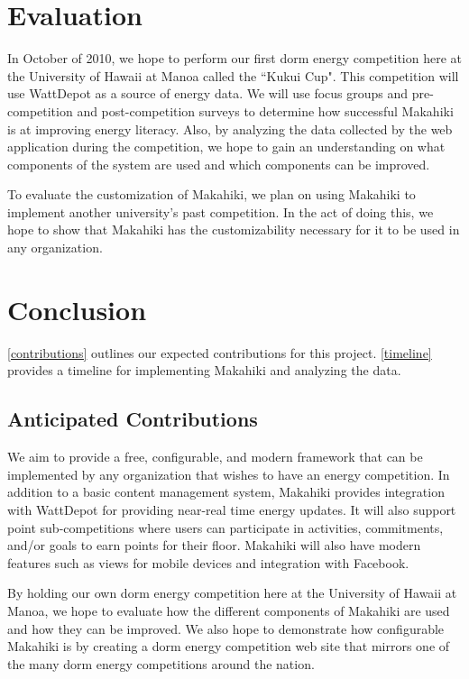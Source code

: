 \chapter{Evaluation}
\label{evaluation}

In October of 2010, we hope to perform our first dorm energy competition here at the University of Hawaii at Manoa called the ``Kukui Cup".  This competition will use WattDepot as a source of energy data.  We will use focus groups and pre-competition and post-competition surveys to determine how successful Makahiki is at improving energy literacy.  Also, by analyzing the data collected by the web application during the competition, we hope to gain an understanding on what components of the system are used and which components can be improved.

To evaluate the customization of Makahiki, we plan on using Makahiki to implement another university's past competition.  In the act of doing this, we hope to show that Makahiki has the customizability necessary for it to be used in any organization.  

\chapter{Conclusion}
\label{conclusion}

\autoref{contributions} outlines our expected contributions for this project.  \autoref{timeline} provides a timeline for implementing Makahiki and analyzing the data.

\section{Anticipated Contributions}
\label{contributions}

We aim to provide a free, configurable, and modern framework that can be implemented by any organization that wishes to have an energy competition.  In addition to a basic content management system, Makahiki provides integration with WattDepot for providing near-real time energy updates.  It will also support point sub-competitions where users can participate in activities, commitments, and/or goals to earn points for their floor.  Makahiki will also have modern features such as views for mobile devices and integration with Facebook.

By holding our own dorm energy competition here at the University of Hawaii at Manoa, we hope to evaluate how the different components of Makahiki are used and how they can be improved.  We also hope to demonstrate how configurable Makahiki is by creating a dorm energy competition web site that mirrors one of the many dorm energy competitions around the nation.

